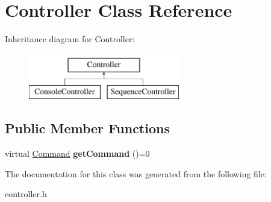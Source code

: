 \hypertarget{class_controller}{}\section{Controller Class Reference}
\label{class_controller}
Inheritance diagram for Controller\+:\begin{figure}[H]
\begin{center}
\leavevmode
\includegraphics[height=2.000000cm]{class_controller}
\end{center}
\end{figure}
\subsection*{Public Member Functions}
\begin{DoxyCompactItemize}
\item 
\mbox{\label{class_controller_a84257cfce42e5565c29f11ef7e86d10a}} 
virtual \hyperlink{struct_command}{Command} {\bfseries get\+Command} ()=0
\end{DoxyCompactItemize}


The documentation for this class was generated from the following file\+:\begin{DoxyCompactItemize}
\item 
controller.\+h\end{DoxyCompactItemize}
